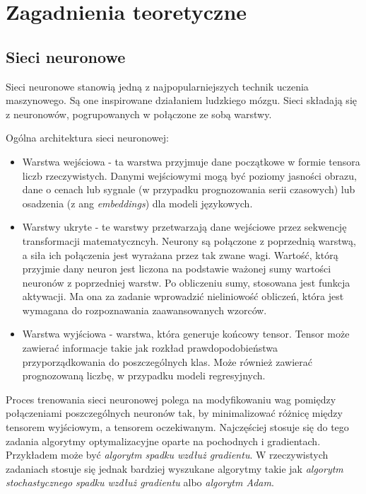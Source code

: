 \chapter{Zagadnienia teoretyczne}


\section{Sieci neuronowe}

Sieci neuronowe stanowią jedną z najpopularniejszych technik uczenia maszynowego. Są one inspirowane działaniem ludzkiego mózgu. Sieci składają się z neuronowów, pogrupowanych w połączone ze sobą warstwy.

Ogólna architektura sieci neuronowej:
\begin{itemize}
    \item Warstwa wejściowa - ta warstwa przyjmuje dane początkowe w formie tensora liczb rzeczywistych. Danymi wejściowymi mogą być poziomy jasności obrazu, dane o cenach lub sygnale (w przypadku prognozowania serii czasowych) lub osadzenia (z ang \textit{embeddings}) dla modeli językowych.
    \item Warstwy ukryte - te warstwy przetwarzają dane wejściowe przez sekwencję transformacji matematyczncyh. Neurony są połączone z poprzednią warstwą, a siła ich połączenia jest wyrażana przez tak zwane wagi. Wartość, którą przyjmie dany neuron jest liczona na podstawie ważonej sumy wartości neuronów z poprzedniej warstw. Po obliczeniu sumy, stosowana jest funkcja aktywacji. Ma ona za zadanie wprowadzić nieliniowość obliczeń, która jest wymagana do rozpoznawania zaawansowanych wzorców.
    \item Warstwa wyjściowa - warstwa, która generuje końcowy tensor. Tensor może zawierać informacje takie jak rozkład prawdopodobieństwa przyporządkowania do poszczególnych klas. Może również zawierać prognozowaną liczbę, w przypadku modeli regresyjnych.
\end{itemize}

Proces trenowania sieci neuronowej polega na modyfikowaniu wag pomiędzy połączeniami poszczególnych neuronów tak, by minimalizować różnicę między tensorem wyjściowym, a tensorem oczekiwanym.
Najczęściej stosuje się do tego zadania algorytmy optymalizacyjne oparte na pochodnych i gradientach. Przykładem może być \textit{algorytm spadku wzdłuż gradientu}.
W rzeczywistych zadaniach stosuje się jednak bardziej wyszukane algorytmy takie jak \textit{algorytm stochastycznego spadku wzdłuż gradientu} albo \textit{algorytm Adam}.


